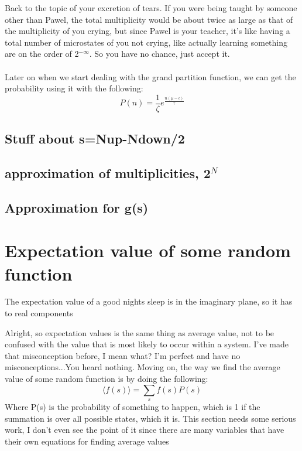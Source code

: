 \documentclass[arial]{article}
\begin{document}
Back to the topic of your excretion of tears. If you were being taught by someone other than Pawel, the total multiplicity would be about twice as large as that of the multiplicity of you crying, but since Pawel is your teacher, it's like having a total number of microstates of you not crying, like actually learning something are on the order of 2$^{-\infty}$. So you have no chance, just accept it.\\
\\
Later on when we start dealing with the grand partition function, we can get the probability using it with the following:
\begin{equation}
P(n)=\frac{1}{\zeta}e^{\frac{n(\mu-\epsilon)}{\tau}}
\end{equation}
\subsection*{Stuff about s=Nup-Ndown/2}

\subsection*{approximation of multiplicities, 2$^{N}$}

\subsection*{Approximation for g(s)}

\section*{Expectation value of some random function}
The expectation value of a good nights sleep is in the imaginary plane, so it has to real components
\vspace{3mm}

Alright, so expectation values is the same thing as average value, not to be confused with the value that is most likely to occur within a system. I've made that misconception before, I mean what? I'm perfect and have no misconceptions...You heard nothing. Moving on, the way we find the average value of some random function is by doing the following:
\begin{equation}
\langle f(s) \rangle =\sum_{s}f(s)P(s)
\end{equation}
Where P(s) is the probability of something to happen, which is 1 if the summation is over all possible states, which it is.
This section needs some serious work, I don't even see the point of it since there are many variables that have their own equations for finding average values
\end{document}
